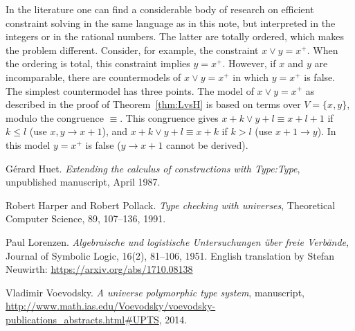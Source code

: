 \documentclass[11pt,a4paper]{article}
\newcommand\set[1]{\{#1\}}
\begin{document}
In the literature one can find a considerable body of research 
on efficient constraint solving in the same language as in this note,
but interpreted in the integers or in the rational numbers.
The latter are totally ordered, which makes the problem different.
Consider, for example, the constraint $x\vee y = x^+$.
When the ordering is total, this constraint implies $y = x^+$.
However, if $x$ and $y$ are incomparable, there are countermodels
of $x\vee y = x^+$ in which $y = x^+$ is false. The simplest
countermodel has three points. The model of $x\vee y = x^+$
as described in the proof of Theorem~\ref{thm:LvsH} is based
on terms over $V=\set{x,y}$, modulo the congruence $\equiv$.
This congruence gives ${x+k \vee y+l} \equiv {x+l+1}$ if $k\leq l$
(use $x,y \to x+1$),
and ${x+k \vee y+l} \equiv {x+k}$ if $k>l$
(use $x+1\to y$).
In this model $y = x^+$ is false ($y\to x+1$ cannot be derived).




\begin{thebibliography}{99}

G\'erard Huet.
\newblock\emph{Extending the calculus of constructions with {Type:Type}},
\newblock unpublished manuscript, April 1987.

Robert Harper and Robert Pollack.
\newblock\emph{Type checking with universes},
Theoretical Computer Science, 89, 107--136, 1991.

Paul Lorenzen.
  \newblock\emph{Algebraische und logistische Untersuchungen über freie Verbände},
Journal of Symbolic Logic, 16(2), 81--106, 1951.
English translation by Stefan Neuwirth: \url{https://arxiv.org/abs/1710.08138}

  Vladimir Voevodsky.
 \newblock\emph{A universe polymorphic type system},
manuscript, 
 \newblock \url{http://www.math.ias.edu/Voevodsky/voevodsky-publications_abstracts.html\#UPTS}, {2014}.



\end{thebibliography}
\end{document}
